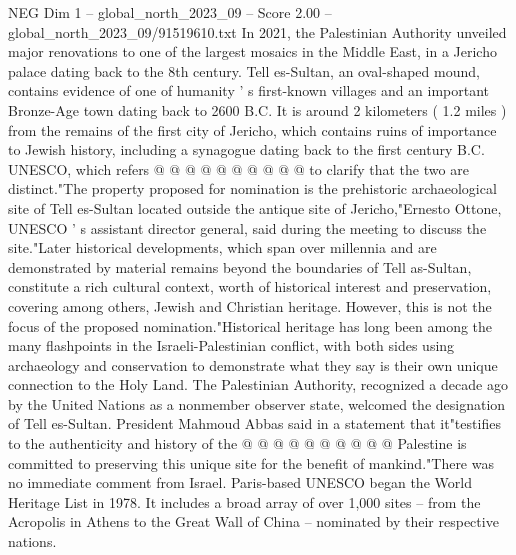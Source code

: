 \begin{textsample}{NEG Dim 1 – global\_north\_2023\_09 – Score 2.00 – global\_north\_2023\_09/91519610.txt}
In 2021, the Palestinian Authority unveiled major renovations to one of the largest mosaics in the Middle East, in a Jericho palace dating back to the 8th century.
Tell es-Sultan, an oval-shaped mound, contains evidence of one of humanity ' s first-known villages and an important Bronze-Age town dating back to 2600 B.C.
It is around 2 kilometers ( 1.2 miles ) from the remains of the first city of Jericho, which contains ruins of importance to Jewish history, including a synagogue dating back to the first century B.C.
UNESCO, which refers @ @ @ @ @ @ @ @ @ @ to clarify that the two are distinct."The property proposed for nomination is the prehistoric archaeological site of Tell es-Sultan located outside the antique site of Jericho,"Ernesto Ottone, UNESCO ' s assistant director general, said during the meeting to discuss the site."Later historical developments, which span over millennia and are demonstrated by material remains beyond the boundaries of Tell as-Sultan, constitute a rich cultural context, worth of historical interest and preservation, covering among others, Jewish and Christian heritage.
However, this is not the focus of the proposed nomination."Historical heritage has long been among the many flashpoints in the Israeli-Palestinian conflict, with both sides using archaeology and conservation to demonstrate what they say is their own unique connection to the Holy Land.
The Palestinian Authority, recognized a decade ago by the United Nations as a nonmember observer state, welcomed the designation of Tell es-Sultan.
President Mahmoud Abbas said in a statement that it"testifies to the authenticity and history of the @ @ @ @ @ @ @ @ @ @ Palestine is committed to preserving this unique site for the benefit of mankind."There was no immediate comment from Israel.
Paris-based UNESCO began the World Heritage List in 1978.
It includes a broad array of over 1,000 sites -- from the Acropolis in Athens to the Great Wall of China -- nominated by their respective nations.

\end{textsample}
